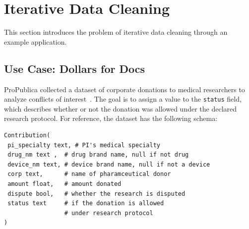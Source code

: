 \section{Iterative Data Cleaning}\label{background}
This section introduces the problem of iterative data cleaning through an example application.

\subsection{Use Case: Dollars for Docs}\label{s:usecase}
ProPublica collected a dataset of corporate donations to medical researchers to analyze conflicts of interest~\cite{dollarsfordocsa}. 
The goal is to assign a value to the \texttt{status} field, which describes whether or not the donation was allowed under the declared research protocol.
For reference, the dataset has the following schema:

{\ssmall\begin{verbatim}
Contribution(
 pi_specialty text, # PI's medical specialty
 drug_nm text ,  # drug brand name, null if not drug
 device_nm text, # device brand name, null if not a device
 corp text,      # name of pharamceutical donor
 amount float,   # amount donated
 dispute bool,   # whether the research is disputed
 status text     # if the donation is allowed 
                 # under research protocol
)
\end{verbatim}
}

% 
% 
% 
% 
% 
% 
% 



